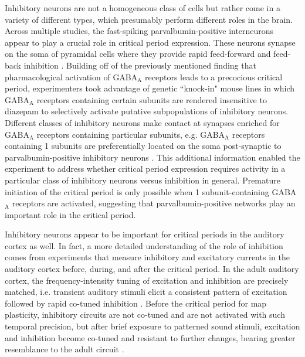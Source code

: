 Inhibitory neurons are not a homogeneous class of cells but rather come in a variety of different types, which presumably perform different roles in the brain. Across multiple studies, the fast-spiking parvalbumin-positive interneurons appear to play a crucial role in critical period expression. These neurons synapse on the soma of pyramidal cells where they provide rapid feed-forward and feed-back inhibition \cite{Markram2004}. Building off of the previously mentioned finding that pharmacological activation of GABA$_\mathrm{A}$ receptors leads to a precocious critical period, experimenters took advantage of genetic ``knock-in" mouse lines in which GABA$_\mathrm{A}$ receptors containing certain subunits are rendered insensitive to diazepam to selectively activate putative subpopulations of inhibitory neurons. Different classes of inhibitory neurons make contact at synapses enriched for GABA$_\mathrm{A}$ receptors containing particular subunits, e.g. GABA$_\mathrm{A}$ receptors containing \textalpha{}1 subunits are preferentially located on the soma post-synaptic to parvalbumin-positive inhibitory neurons \cite{Fagiolini2004}. This additional information enabled the experiment to address whether critical period expression requires activity in a particular class of inhibitory neurons versus inhibition in general.  Premature initiation of the critical period is only possible when \textalpha{}1 subunit-containing GABA$_\mathrm{A}$ receptors are activated, suggesting that parvalbumin-positive networks play an important role in the critical period.

Inhibitory neurons appear to be important for critical periods in the auditory cortex as well. In fact, a more detailed understanding of the role of inhibition comes from experiments that measure inhibitory and excitatory currents in the auditory cortex before, during, and after the critical period. In the adult auditory cortex, the frequency-intensity tuning of excitation and inhibition are precisely matched, i.e. transient auditory stimuli elicit a consistent pattern of excitation followed by rapid co-tuned inhibition \cite{Wehr2003, Wehr2005}. Before the critical period for map plasticity, inhibitory circuits are not co-tuned and are not activated with such temporal precision, but after brief exposure to patterned sound stimuli, excitation and inhibition become co-tuned and resistant to further changes, bearing greater resemblance to the adult circuit \cite{Dorrn2010}.

